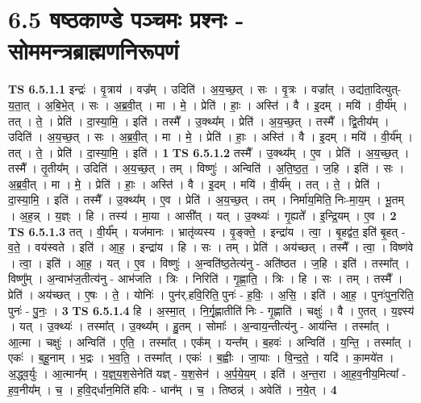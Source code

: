 \documentclass[17pt]{extarticle}
\begin{document}
\section*{ 6.5      षष्ठकाण्डे पञ्चमः प्रश्नः - सोममन्त्रब्राह्मणनिरूपणं }
                                \textbf{ TS 6.5.1.1} \newline
                  इन्द्रः॑ । वृ॒त्राय॑ । वज्र᳚म् । उदिति॑ । अ॒य॒च्छ॒त् । सः । वृ॒त्रः । वज्रा᳚त् । उद्य॑ता॒दित्युत्-य॒ता॒त् । अ॒बि॒भे॒त् । सः । अ॒ब्र॒वी॒त् । मा । मे॒ । प्रेति॑ । हाः॒ । अस्ति॑ । वै । इ॒दम् । मयि॑ । वी॒र्य᳚म् । तत् । ते॒ । प्रेति॑ । दा॒स्या॒मि॒ । इति॑ । तस्मै᳚ । उ॒क्थ्य᳚म् । प्रेति॑ । अ॒य॒च्छ॒त् । तस्मै᳚ । द्वि॒तीय᳚म् । उदिति॑ । अ॒य॒च्छ॒त् । सः । अ॒ब्र॒वी॒त् । मा । मे॒ । प्रेति॑ । हाः॒ । अस्ति॑ । वै । इ॒दम् । मयि॑ । वी॒र्य᳚म् । तत् । ते॒ । प्रेति॑ । दा॒स्या॒मि॒ । इति॑ । \textbf{  1 } \newline
                  \newline
                                \textbf{ TS 6.5.1.2} \newline
                  तस्मै᳚ । उ॒क्थ्य᳚म् । ए॒व । प्रेति॑ । अ॒य॒च्छ॒त् । तस्मै᳚ । तृ॒तीय᳚म् । उदिति॑ । अ॒य॒च्छ॒त् । तम् । विष्णुः॑ । अन्विति॑ । अ॒ति॒ष्ठ॒त॒ । ज॒हि । इति॑ । सः । अ॒ब्र॒वी॒त् । मा । मे॒ । प्रेति॑ । हाः॒ । अस्ति॑ । वै । इ॒दम् । मयि॑ । वी॒र्य᳚म् । तत् । ते॒ । प्रेति॑ । दा॒स्या॒मि॒ । इति॑ । तस्मै᳚ । उ॒क्थ्य᳚म् । ए॒व । प्रेति॑ । अ॒य॒च्छ॒त् । तम् । निर्मा॑य॒मिति॒ निः-मा॒य॒म् । भू॒तम् । अ॒ह॒न्न् । य॒ज्ञ्ः । हि । तस्य॑ । मा॒या । आसी᳚त् । यत् । उ॒क्थ्यः॑ । गृ॒ह्यते᳚ । इ॒न्द्रि॒यम् । ए॒व । \textbf{  2} \newline
                  \newline
                                \textbf{ TS 6.5.1.3} \newline
                  तत् । वी॒र्य᳚म् । यज॑मानः । भ्रातृ॑व्यस्य । वृ॒ङ्क्ते॒ । इन्द्रा॑य । त्वा॒ । बृ॒हद्व॑त॒ इति॑ बृ॒हत् - व॒ते॒ । वय॑स्वते । इति॑ । आ॒ह॒ । इन्द्रा॑य । हि । सः । तम् । प्रेति॑ । अय॑च्छत् । तस्मै᳚ । त्वा॒ । विष्ण॑वे । त्वा॒ । इति॑ । आ॒ह॒ । यत् । ए॒व । विष्णुः॑ । अ॒न्वति॑ष्ठ॒तेत्य॑नु - अति॑ष्ठत । ज॒हि । इति॑ । तस्मा᳚त् । विष्णु᳚म् । अ॒न्वाभ॑ज॒तीत्य॑नु - आभ॑जति । त्रिः । निरिति॑ । गृ॒ह्णा॒ति॒ । त्रिः । हि । सः । तम् । तस्मै᳚ । प्रेति॑ । अय॑च्छत् । ए॒षः । ते॒ । योनिः॑ । पुन॑र्.हवि॒रिति॒ पुनः॑ - ह॒विः॒ । अ॒सि॒ । इति॑ । आ॒ह॒ । पुनः॑पुन॒रिति॒ पुनः॑ - पु॒नः॒ । \textbf{  3} \newline
                  \newline
                                \textbf{ TS 6.5.1.4} \newline
                  हि । अ॒स्मा॒त् । नि॒र्गृ॒ह्णातीति॑ निः - गृ॒ह्णाति॑ । चक्षुः॑ । वै । ए॒तत् । य॒ज्ञ्स्य॑ । यत् । उ॒क्थ्यः॑ । तस्मा᳚त् । उ॒क्थ्य᳚म् । हु॒तम् । सोमाः᳚ । अ॒न्वाय॒न्तीत्य॑नु - आय॑न्ति । तस्मा᳚त् । आ॒त्मा । चक्षुः॑ । अन्विति॑ । ए॒ति॒ । तस्मा᳚त् । एक᳚म् । यन्त᳚म् । ब॒हवः॑ । अन्विति॑ । य॒न्ति॒ । तस्मा᳚त् । एकः॑ । ब॒हू॒नाम् । भ॒द्रः । भ॒व॒ति॒ । तस्मा᳚त् । एकः॑ । ब॒ह्वीः । जा॒याः । वि॒न्द॒ते॒ । यदि॑ । का॒मये॑त । अ॒द्ध्व॒र्युः । आ॒त्मान᳚म् । य॒ज्ञ्॒य॒श॒सेनेति॑ यज्ञ् - य॒श॒सेन॑ । अ॒र्प॒ये॒य॒म् । इति॑ । अ॒न्त॒रा । आ॒ह॒व॒नीय॒मित्या᳚ - ह॒व॒नीय᳚म् । च॒ । ह॒वि॒द्‌र्धान॒मिति॑ हविः - धान᳚म् । च॒ । तिष्ठन्न्॑ । अवेति॑ । न॒ये॒त् । \textbf{  4} \newline
\end{document}

